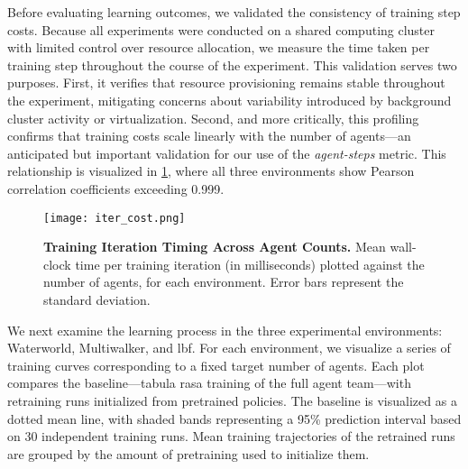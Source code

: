 \documentclass{article}
\begin{document}
Before evaluating learning outcomes, we validated the consistency of training step costs.
Because all experiments were conducted on a shared computing cluster with limited 
control over resource allocation, we measure the time taken per training
step throughout the course of the experiment. This validation serves two purposes. First, 
it verifies that resource provisioning remains stable throughout the experiment, 
mitigating concerns about variability introduced by background cluster activity or virtualization.
Second, and more critically, this profiling confirms that training costs scale linearly 
with the number of agents—an anticipated but important validation for our use of the 
\emph{agent-steps} metric. This relationship is visualized in \cref{con1:fig:agent-steps}, 
where all three environments show Pearson correlation coefficients exceeding 0.999.
\begin{figure}[!ht]
    \centering
    \texttt{[image: iter\_cost.png]}
    \caption{\textbf{Training Iteration Timing Across Agent Counts.}
        Mean wall-clock time per training iteration (in milliseconds) plotted against the number 
        of agents, for each environment. Error bars represent the standard deviation.}
    \label{con1:fig:agent-steps}
\end{figure}
%

We next examine the learning process in the three experimental environments: 
Waterworld, Multiwalker, and \gls{lbf}. For each environment, 
we visualize a series of training curves corresponding to a fixed target number of agents.
Each plot compares the baseline—tabula rasa training of the full agent team—with 
retraining runs initialized from pretrained policies.
The baseline is visualized as a dotted mean line, with shaded bands 
representing a 95\% prediction interval based on 30 independent training runs.
Mean training trajectories of the retrained runs are grouped by the amount 
of pretraining used to initialize them.
\end{document}
